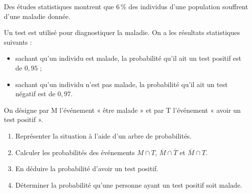 \documentclass[a4paper,11pt]{article}
\begin{document}
\begin{cexercice}
Des études statistiques montrent que 6\,\% des individus d’une population souffrent d’une maladie donnée.

Un test est utilisé pour diagnostiquer la maladie. On a les résultats statistiques suivants :
\begin{itemize}
	\item sachant qu’un individu est malade, la probabilité qu’il ait un test positif est de $0,95$ ;
	\item sachant qu’un individu n’est pas malade, la probabilité qu’il ait un test négatif est de $0,97$.
\end{itemize}
On désigne par M l’événement « être malade » et par T l’événement « avoir un test positif ».
%
\begin{enumerate}
	\item Représenter la situation à l'aide d'un arbre de probabilités.
	\item Calculer les probabilités des événements $M \cap T$, $\overline{M} \cap \overline{T}$ et $\overline{M} \cap T$.
	\item En déduire la probabilité d’avoir un test positif.
	\item Déterminer la probabilité qu’une personne ayant un test positif soit malade.
\end{enumerate}
\end{cexercice}
\end{document}
